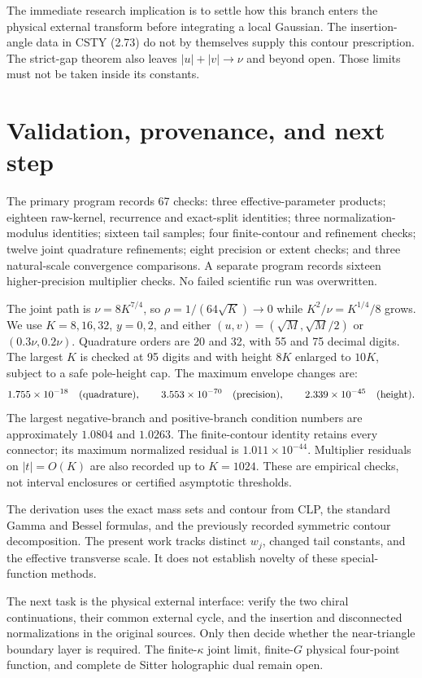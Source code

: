 \documentclass[11pt,a4paper]{article}
\begin{document}
The immediate research implication is to settle how this branch enters
the physical external transform before integrating a local Gaussian.
The insertion-angle data in CSTY (2.73) \cite{csty} do not by themselves
supply this contour prescription.
The strict-gap theorem also leaves \(|u|+|v|\to\nu\) and beyond open.
Those limits must not be taken inside its constants.

\newpage
\section{Validation, provenance, and next step}
The primary program records 67 checks:
three effective-parameter products; eighteen raw-kernel,
recurrence and exact-split identities; three normalization-modulus
identities; sixteen tail samples; four finite-contour and refinement
checks; twelve joint quadrature refinements; eight precision or extent
checks; and three natural-scale convergence comparisons.
A separate program records sixteen higher-precision multiplier checks.
No failed scientific run was overwritten.

The joint path is \(\nu=8K^{7/4}\), so
\(\rho=1/(64\sqrt K)\to0\) while \(K^2/\nu=K^{1/4}/8\) grows.
We use \(K=8,16,32\), \(y=0,2\), and either
\((u,v)=(\sqrt M,\sqrt M/2)\) or \((0.3\nu,0.2\nu)\).
Quadrature orders are 20 and 32, with 55 and 75 decimal digits.
The largest \(K\) is checked at 95 digits and with height
\(8K\) enlarged to \(10K\), subject to a safe pole-height cap.
The maximum envelope changes are:
\[
 1.755\times10^{-18}\quad\hbox{(quadrature)},\qquad
 3.553\times10^{-70}\quad\hbox{(precision)},\qquad
 2.339\times10^{-45}\quad\hbox{(height)}.
\]
The largest negative-branch and positive-branch condition numbers are
approximately \(1.0804\) and \(1.0263\).
The finite-contour identity retains every connector; its maximum
normalized residual is \(1.011\times10^{-44}\).
Multiplier residuals on \(|t|=O(K)\) are also recorded up to \(K=1024\).
These are empirical checks, not interval enclosures or certified
asymptotic thresholds.

The derivation uses the exact mass sets and contour from CLP,
the standard Gamma and Bessel formulas, and the previously recorded
symmetric contour decomposition. The present work tracks distinct
\(w_j\), changed tail constants, and the effective transverse scale.
It does not establish novelty of these special-function methods.

The next task is the physical external interface: verify the
two chiral continuations, their common external cycle, and the insertion
and disconnected normalizations in the original sources.
Only then decide whether the near-triangle boundary layer is required.
The finite-\(\kappa\) joint limit, finite-\(G\) physical four-point
function, and complete de Sitter holographic dual remain open.
\end{document}
